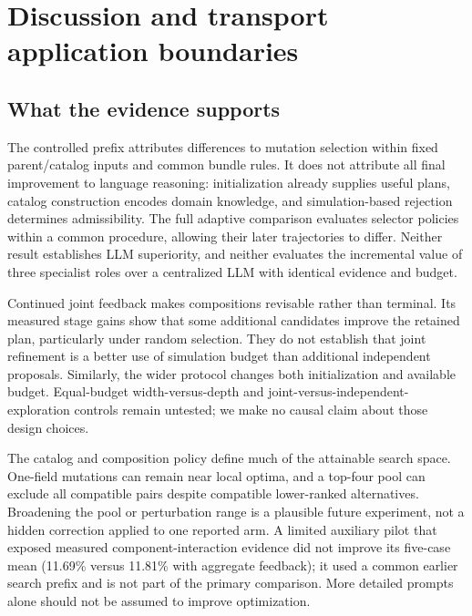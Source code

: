 \documentclass[11pt]{article}
\begin{document}
\begin{table}[htbp]\centering\small
\caption{Remote deterioration in adaptive outcomes. Cases have at least one remote edge worsening by over 60 vehicle-seconds. Maxima and median maxima include no-ops; cell values concern fixed 500-m regions.}\label{tab:spatial}

\end{table}

\section{Discussion and transport application boundaries}\label{sec:discussion}
\subsection{What the evidence supports}
The controlled prefix attributes differences to mutation selection within fixed parent/catalog inputs and common bundle rules. It does not attribute all final improvement to language reasoning: initialization already supplies useful plans, catalog construction encodes domain knowledge, and simulation-based rejection determines admissibility. The full adaptive comparison evaluates selector policies within a common procedure, allowing their later trajectories to differ. Neither result establishes LLM superiority, and neither evaluates the incremental value of three specialist roles over a centralized LLM with identical evidence and budget.

Continued joint feedback makes compositions revisable rather than terminal. Its measured stage gains show that some additional candidates improve the retained plan, particularly under random selection. They do not establish that joint refinement is a better use of simulation budget than additional independent proposals. Similarly, the wider protocol changes both initialization and available budget. Equal-budget width-versus-depth and joint-versus-independent-exploration controls remain untested; we make no causal claim about those design choices.

The catalog and composition policy define much of the attainable search space. One-field mutations can remain near local optima, and a top-four pool can exclude all compatible pairs despite compatible lower-ranked alternatives. Broadening the pool or perturbation range is a plausible future experiment, not a hidden correction applied to one reported arm. A limited auxiliary pilot that exposed measured component-interaction evidence did not improve its five-case mean (11.69\% versus 11.81\% with aggregate feedback); it used a common earlier search prefix and is not part of the primary comparison. More detailed prompts alone should not be assumed to improve optimization.
\end{document}
